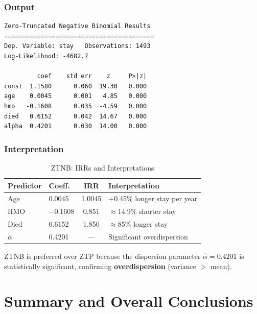 \documentclass[12pt,a4paper]{article}
\begin{document}
\subsubsection{Output}

\begin{lstlisting}[style=outputstyle]
Zero-Truncated Negative Binomial Results
=========================================
Dep. Variable: stay   Observations: 1493
Log-Likelihood: -4682.7

         coef    std err    z     P>|z|
const  1.1580      0.060  19.30   0.000
age    0.0045      0.001   4.85   0.000
hmo   -0.1608      0.035  -4.59   0.000
died   0.6152      0.042  14.67   0.000
alpha  0.4201      0.030  14.00   0.000
\end{lstlisting}

\subsubsection{Interpretation}

\begin{table}[H]
  \centering
  \caption{ZTNB: IRRs and Interpretations}
  \begin{tabular}{llcl}
    \toprule
    \textbf{Predictor} & \textbf{Coeff.} & \textbf{IRR} & \textbf{Interpretation} \\
    \midrule
    Age       &  0.0045   & 1.0045 & $+$0.45\% longer stay per year \\
    HMO       & $-0.1608$ & 0.851  & $\approx$14.9\% shorter stay \\
    Died      &  0.6152   & 1.850  & $\approx$85\% longer stay \\
    $\alpha$  &  0.4201   & ---    & Significant overdispersion \\
    \bottomrule
  \end{tabular}
\end{table}

ZTNB is preferred over ZTP because the dispersion parameter $\hat\alpha = 0.4201$ is statistically significant, confirming \textbf{overdispersion} (variance $>$ mean).

\section{Summary and Overall Conclusions}
\end{document}
